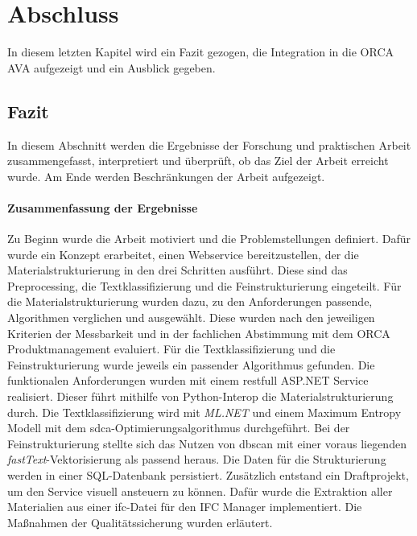 \chapter{Abschluss}
\label{c:closing}
In diesem letzten Kapitel wird ein Fazit gezogen, die Integration in die ORCA AVA aufgezeigt und ein Ausblick gegeben.

\section{Fazit}
\label{c:closing:conclusion}
In diesem Abschnitt werden die Ergebnisse der Forschung und praktischen Arbeit zusammengefasst, interpretiert und überprüft, ob das Ziel der Arbeit erreicht wurde. Am Ende werden Beschränkungen der Arbeit aufgezeigt.

\subsubsection{Zusammenfassung der Ergebnisse}
Zu Beginn wurde die Arbeit motiviert und die Problemstellungen definiert. Dafür wurde ein Konzept erarbeitet, einen Webservice bereitzustellen, der die Materialstrukturierung in den drei Schritten ausführt. Diese sind das Preprocessing, die Textklassifizierung und die Feinstrukturierung eingeteilt. Für die Materialstrukturierung wurden dazu, zu den Anforderungen passende, Algorithmen verglichen und ausgewählt. Diese wurden nach den jeweiligen Kriterien der Messbarkeit und in der fachlichen Abstimmung mit dem ORCA Produktmanagement evaluiert. Für die Textklassifizierung und die Feinstrukturierung wurde jeweils ein passender Algorithmus gefunden. Die funktionalen Anforderungen wurden mit einem \ac{rest}full ASP.NET Service realisiert. Dieser führt mithilfe von Python-Interop die Materialstrukturierung durch. Die Textklassifizierung wird mit \textit{ML.NET} und einem Maximum Entropy Modell mit dem \ac{sdca}-Optimierungsalgorithmus durchgeführt. Bei der Feinstrukturierung stellte sich das Nutzen von \ac{dbscan} mit einer voraus liegenden \textit{fastText}-Vektorisierung als passend heraus. Die Daten für die Strukturierung werden in einer SQL-Datenbank persistiert. Zusätzlich entstand ein Draftprojekt, um den Service visuell ansteuern zu können. Dafür wurde die Extraktion aller Materialien aus einer \ac{ifc}-Datei für den IFC Manager implementiert. Die Maßnahmen der Qualitätssicherung wurden erläutert.

